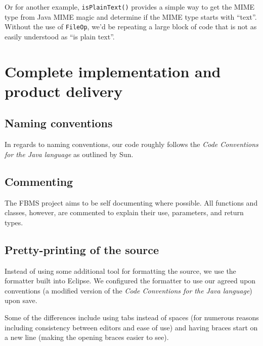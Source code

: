 \documentclass[12pt,a4paper]{article}
\begin{document}
Or for another example, \texttt{isPlainText()} provides a simple way to get the MIME type from Java MIME magic and determine if the MIME type starts with ``text''. Without the use of \texttt{FileOp}, we'd be repeating a large block of code that is not as easily understood as ``is plain text''.

\section{Complete implementation and product delivery}

\subsection{Naming conventions}
In regards to naming conventions, our code roughly follows the \textit{Code Conventions for the Java language}\cite{conventions} as outlined by Sun.

\subsection{Commenting}
The FBMS project aims to be self documenting where possible. All functions and classes, however, are commented to explain their use, parameters, and return types.

\subsection{Pretty-printing of the source}
Instead of using some additional tool for formatting the source, we use the formatter built into Eclipse\cite{eclipse}. We configured the formatter to use our agreed upon conventions (a modified version of the \textit{Code Conventions for the Java language}\cite{conventions}) upon save.

Some of the differences include using tabs instead of spaces (for numerous reasons including consistency between editors and ease of use) and having braces start on a new line (making the opening braces easier to see).
\end{document}
